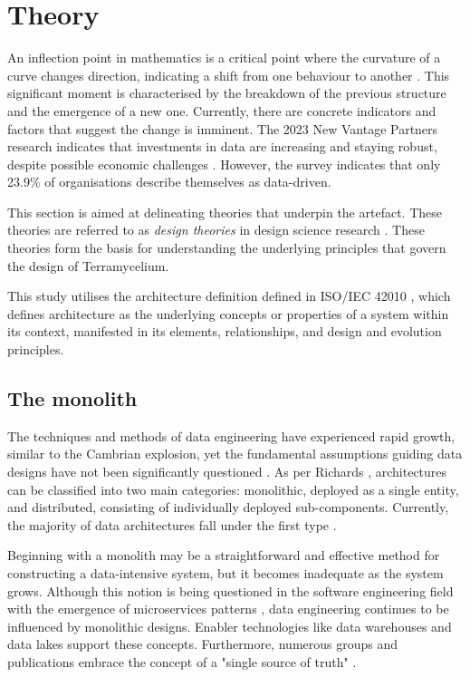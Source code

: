\documentclass{ieeeaccess}
\begin{document}
\section{Theory}

\label{sec:theory}

An inflection point in mathematics is a critical point where the curvature of a curve changes direction, indicating a shift from one behaviour to another \cite{inflectionPoint}. This significant moment is characterised by the breakdown of the previous structure and the emergence of a new one. Currently, there are concrete indicators and factors that suggest the change is imminent. The 2023 New Vantage Partners research indicates that investments in data are increasing and staying robust, despite possible economic challenges \cite{newvantagepartners2023}. However, the survey indicates that only 23.9\% of organisations describe themselves as data-driven. 

This section is aimed at delineating theories that underpin the artefact. These theories are referred to as \emph{design theories} in design science research \cite{Rose}. These theories form the basis for understanding the underlying principles that govern the design of Terramycelium.

This study utilises the architecture definition defined in ISO/IEC 42010 \cite{ISO42010}, which defines architecture as the underlying concepts or properties of a system within its context, manifested in its elements, relationships, and design and evolution principles.

\subsection{The monolith}

The techniques and methods of data engineering have experienced rapid growth, similar to the Cambrian explosion, yet the fundamental assumptions guiding data designs have not been significantly questioned \cite{DataMesh}. As per Richards \cite{richards2020fundamentals}, architectures can be classified into two main categories: monolithic, deployed as a single entity, and distributed, consisting of individually deployed sub-components. Currently, the majority of data architectures fall under the first type \cite{ataei2022state}. 

Beginning with a monolith may be a straightforward and effective method for constructing a data-intensive system, but it becomes inadequate as the system grows. Although this notion is being questioned in the software engineering field with the emergence of microservices patterns \cite{MicroServicesPatterns}, data engineering continues to be influenced by monolithic designs. Enabler technologies like data warehouses and data lakes support these concepts. Furthermore, numerous groups and publications embrace the concept of a "single source of truth" \cite{ataei2022state}.
\end{document}
